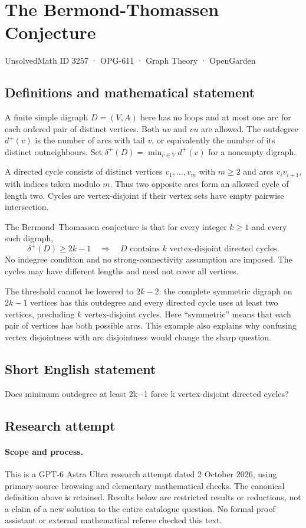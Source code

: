 \documentclass[11pt,a4paper]{article}
\begin{document}
\section*{The Bermond-Thomassen Conjecture}\label{3257}
{\small UnsolvedMath ID 3257 · OPG-611 · Graph Theory · OpenGarden}
\subsection{Definitions and mathematical statement}
A finite simple digraph $D=(V,A)$ here has no loops and at most one arc
for each ordered pair of distinct vertices. Both $uv$ and $vu$ are
allowed. The outdegree $d^+(v)$ is the number of arcs with tail $v$, or
equivalently the number of its distinct outneighbours. Set
$\delta^+(D)=\min_{v\in V}d^+(v)$ for a nonempty digraph.

A directed cycle consists of distinct vertices $v_1,\ldots,v_m$ with
$m\ge2$ and arcs $v_iv_{i+1}$, with indices taken modulo $m$. Thus two
opposite arcs form an allowed cycle of length two. Cycles are
vertex-disjoint if their vertex sets have empty pairwise intersection.

The Bermond--Thomassen conjecture is that for every integer $k\ge1$ and
every such digraph,
\[
         \delta^+(D)\ge2k-1
        \quad\Longrightarrow\quad
        D\text{ contains }k\text{ vertex-disjoint directed cycles}.
\]
No indegree condition and no strong-connectivity assumption are imposed.
The cycles may have different lengths and need not cover all vertices.

The threshold cannot be lowered to $2k-2$: the complete symmetric
digraph on $2k-1$ vertices has this outdegree and every directed cycle
uses at least two vertices, precluding $k$ vertex-disjoint cycles.
Here ``symmetric'' means that each pair of vertices has both possible
arcs. This example also explains why confusing vertex disjointness with
arc disjointness would change the sharp question.
\subsection{Short English statement}
Does minimum outdegree at least 2k−1 force k vertex-disjoint directed cycles?
\subsection{Research attempt}
\paragraph{Scope and process.}
This is a GPT-6 Astra Ultra research attempt dated 2 October 2026, using
primary-source browsing and elementary mathematical checks. The canonical
definition above is retained. Results below are restricted results or
reductions, not a claim of a new solution to the entire catalogue question.
No formal proof assistant or external mathematical referee checked this text.
\end{document}

